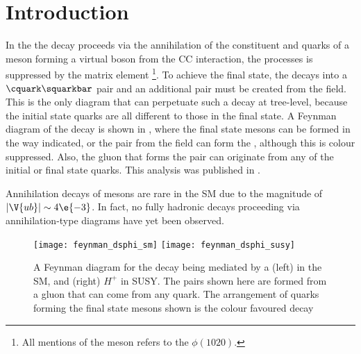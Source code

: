 \section{Introduction}
In the \sm the decay \btodsphi proceeds via the annihilation of the constituent \bquark and \uquark
quarks of a \Bp meson
forming a virtual \Wp boson from the \gls{CC} interaction, the processes is suppressed by the \ckm
matrix element \footnote{
  All mentions of the \phii meson refers to the $\phi(1020)$.
}.
To achieve the final state, the \Wp decays into a $\cquark\squarkbar$ pair and an additional
\ssbar pair must be created from the \QCD field.
This is the only diagram that can perpetuate such a decay at tree-level, because the initial state
quarks are all different to those in the final state.
A Feynman diagram of the decay \btodsphi is
shown in , where
the final state mesons can be formed in the way indicated, or the \ssbar pair from the \QCD field
can form the \phii, although this is colour suppressed.
Also, the gluon that forms the \ssbar pair can originate from any of the initial or final state
quarks.
This analysis was published in .

Annihilation decays of \Bp mesons are rare in the SM due to the magnitude of
$|\V{ub}|\sim4\e{-3}$.
In fact, no fully hadronic decays proceeding via annihilation-type diagrams have yet been
observed.


\begin{figure}
  \begin{center}
    \texttt{[image: feynman\_dsphi\_sm]}
    \texttt{[image: feynman\_dsphi\_susy]}
    \caption[Feynman diagram for the decay \btodsphi]
    {
      A Feynman diagram for the decay \btodsphi being mediated by a
      (left) \Wp in the SM, and
      (right) $H^+$ in SUSY.
      The \ssbar pairs shown here are formed from a gluon that can come from any quark.
      The arrangement of quarks forming the final state mesons shown is the colour favoured decay
    }
    \label{fig:dsphi:feyn}
  \end{center}
\end{figure}



